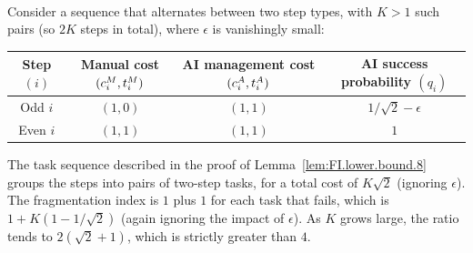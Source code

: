 \documentclass[12pt, final]{article}
\begin{document}
\\[-0.2em]
\noindent{\color{black!25}\rule{\linewidth}{0.4pt}}\par\vspace{1em}
\renewcommand\theexample{OA-\arabic{example}}
\setcounter{example}{2}
\begin{example}
\label{ex:FI.necessity}
Consider a sequence that alternates between two step types, with $K > 1$ such pairs (so $2K$ steps in total), where $\epsilon$ is vanishingly small:
\begin{center}
\begin{tabular}{c|ccc}
\toprule
\makecell{Step\\$(i)$} & \makecell{Manual cost\\$(c^{M}_{i}, t^{M}_{i})$} & \makecell{AI management cost\\$(c^{A}_{i}, t^{A}_{i})$} & \makecell{AI success probability\\$(q_i)$} \\
\midrule
Odd $i$ & $(1, 0)$ & $(1, 1)$ & $1/\sqrt{2}-\epsilon$ \\
Even $i$ & $(1, 1)$ & $(1, 1)$ & $1$ \\
\bottomrule
\end{tabular}
\end{center}
The task sequence described in the proof of Lemma~\ref{lem:FI.lower.bound.8} groups the steps into pairs of two-step tasks, for a total cost of $K \sqrt{2}$ (ignoring $\epsilon$).
The fragmentation index is $1$ plus $1$ for each task that fails, which is $1 + K(1 - 1/\sqrt{2})$ (again ignoring the impact of $\epsilon$).
As $K$ grows large, the ratio tends to $2(\sqrt{2}+1)$, which is strictly greater than $4$.
\end{example}
\clearpage
\end{document}
